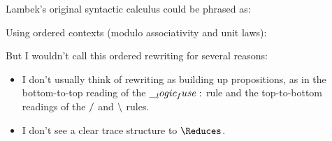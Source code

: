 Lambek's original syntactic calculus could be phrased as:
Using ordered contexts (modulo associativity and unit laws):
But I wouldn't call this ordered rewriting for several reasons:
\begin{itemize}
\item I don't usually think of rewriting as building up propositions, as in the bottom-to-top reading of the $\__logic_fuse:$ rule and the top-to-bottom readings of the $\mathbin { / }$ and $\mathbin { \setminus }$ rules.
\item I don't see a clear trace structure to $\Reduces$.
\end{itemize}



